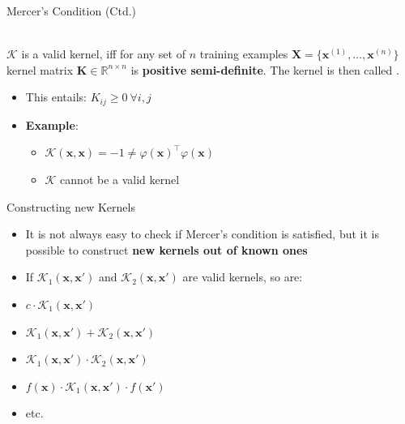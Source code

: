 \begin{frame}{Mercer's Condition (Ctd.)}{}\important
	\begin{boxBlue}
		 \\
		$\mathcal{K}$ is a valid kernel, iff for any set of $n$ training examples $\bm{X} = \{ \bm{x}^{(1)}, \dots, \bm{x}^{(n)} \}$ kernel matrix
		$\bm{K} \in \mathbb{R}^{n \times n}$ is \textbf{positive semi-definite}. The kernel is then called .
	\end{boxBlue}

	\begin{itemize}
		\item This entails: $K_{ij} \ge 0\ \forall i, j$
		\item \textbf{Example}:
		\begin{itemize}
			\item $\mathcal{K}(\bm{x}, \bm{x}) = -1 \ne \varphi(\bm{x})^{\intercal} \varphi(\bm{x})$
			\item $\mathcal{K}$ cannot be a valid kernel
		\end{itemize}
	\end{itemize}
\end{frame}


\begin{frame}{Constructing new Kernels}{}
	\begin{itemize}
		\item It is not always easy to check if Mercer's condition is satisfied, but it is possible to construct
			\textbf{new kernels out of known ones}
		\item If $\mathcal{K}_1(\bm{x}, \bm{x'})$ and $\mathcal{K}_2(\bm{x}, \bm{x'})$ are valid kernels, so are:
	\end{itemize}
	
	\begin{boxBlueNoFrame}
		\begin{itemize}
			\setlength\itemsep{0em}
			\item $c \cdot \mathcal{K}_1(\bm{x}, \bm{x'})$
			\item $\mathcal{K}_1(\bm{x}, \bm{x'}) + \mathcal{K}_2(\bm{x}, \bm{x'})$
			\item $\mathcal{K}_1(\bm{x}, \bm{x'}) \cdot \mathcal{K}_2(\bm{x}, \bm{x'})$
			\item $f(\bm{x}) \cdot \mathcal{K}_1(\bm{x}, \bm{x'}) \cdot f(\bm{x'})$
			\item etc.
		\end{itemize}
	\end{boxBlueNoFrame}
\end{frame}



